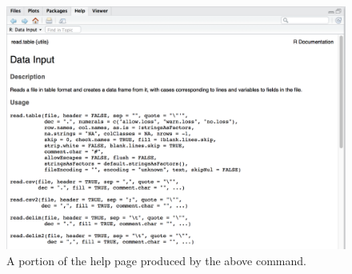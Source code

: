 \documentclass[
]{book}
\begin{document}
\begin{figure}

{\centering \includegraphics[width=1\linewidth]{figures/help_output} 

}

\caption{A portion of the help page produced by the above command.}\label{fig:help-output}
\end{figure}
\end{document}
